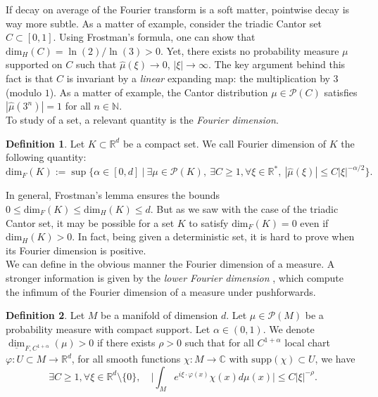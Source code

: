\documentclass[a4paper]{article}
\theoremstyle{definition}
\newtheorem{definition}{Definition}[section]
\begin{document}
If decay on average of the Fourier transform is a soft matter, pointwise decay is way more subtle. As a matter of example, consider the triadic Cantor set $C \subset[0,1]$. Using Frostman's formula, one can show that $\text{dim}_H(C) = \ln(2)/\ln(3)>0$. Yet, there exists no probability measure $\mu$ supported on $C$ such that $\widehat{\mu}(\xi){\longrightarrow} 0$, $|\xi| \rightarrow \infty$. The key argument behind this fact is that $C$ is invariant by a \emph{linear} expanding map: the multiplication by $3$ (modulo $1$). As a matter of example, the Cantor distribution $\mu \in \mathcal{P}(C)$ satisfies $|\widehat{\mu}(3^n)| = 1$ for all $n \in \mathbb{N}$. \\

To study  of a set, a relevant quantity is the \emph{Fourier dimension}.
\begin{definition}\label{def:dimfourier}
Let $K \subset \mathbb{R}^d$ be a compact set. We call Fourier dimension of $K$ the following quantity:
$$ \text{dim}_F(K) := \sup\Big\{ \alpha \in [0,d] \ \Big| \ \exists \mu \in \mathcal{P}(K), \ \exists C \geq 1, \forall \xi \in \mathbb{R}^*, \ |\widehat{\mu}(\xi)| \leq C |\xi|^{-\alpha/2} \Big\}. $$
\end{definition}

In general, Frostman's lemma ensures the bounds $0 \leq \text{dim}_F(K) \leq \text{dim}_H(K) \leq d$. But as we saw with the case of the triadic Cantor set, it may be possible for a set $K$ to satisfy $\text{dim}_F(K)=0$ even if $\text{dim}_H(K)>0$. In fact, being given a deterministic set, it is hard to prove when its Fourier dimension is positive. \\

We can define in the obvious manner the Fourier dimension of a measure. A stronger information is given by the \emph{lower Fourier dimension} \cite{Le24}, which compute the infimum of the Fourier dimension of a measure under pushforwards.

\begin{definition}\label{def:lowerdimfourier}
Let $M$ be a manifold of dimension $d$. Let $\mu \in \mathcal{P}(M)$ be a probability measure with compact support. Let $\alpha \in (0,1)$. We denote $ \underline{\dim}_{F,C^{1+\alpha}}(\mu)>0 $ if there exists $\rho >0$ such that for all $C^{1+\alpha}$ local chart $\varphi : U \subset M \rightarrow \mathbb{R}^d$, for all smooth functions $\chi : M \rightarrow \mathbb{C}$ with $\text{supp}(\chi) \subset U$, we have
$$ \exists C \geq 1,  \forall \xi \in \mathbb{R}^d \setminus \{0\}, \quad   \Big| \int_{M} e^{i \xi \cdot \varphi(x)} \chi(x) d\mu(x) \Big| \leq C |\xi|^{-\rho}. $$
\end{definition}
\end{document}

